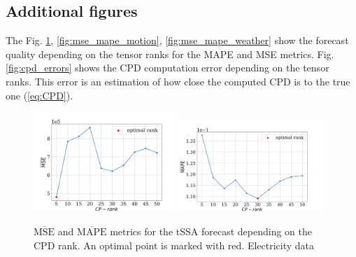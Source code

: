 \documentclass[referee, pdflatex, sn-mathphys-num]{sn-jnl}
\theoremstyle{definition}
\theoremstyle{plain}
\begin{document}
	\begin{appendices}
		
		\section{Additional figures}
		
		The Fig. \ref{fig:mse_mape_electr}, \ref{fig:mse_mape_motion}, \ref{fig:mse_mape_weather} show the forecast quality depending on the tensor ranks for the MAPE and MSE metrics. Fig. \ref{fig:cpd_errors} shows the CPD computation error depending on the tensor ranks. This error is an estimation of how close the computed CPD is to the true one (\ref{eq:CPD}).
		
		\begin{figure}[h]
			\centering
			\includegraphics[width=0.48\textwidth, keepaspectratio]{pred_MSE_rank_elec.png}
			\includegraphics[width=0.48\textwidth, keepaspectratio]{pred_MAPE_rank_elec.png}
			\caption{$ \overline{\text{MSE}} $ and $ \overline{\text{MAPE}} $ metrics for the tSSA forecast depending on the CPD rank. An optimal point is marked with red. Electricity data}\label{fig:mse_mape_electr}
		\end{figure}
		

\end{appendices}
\end{document}
